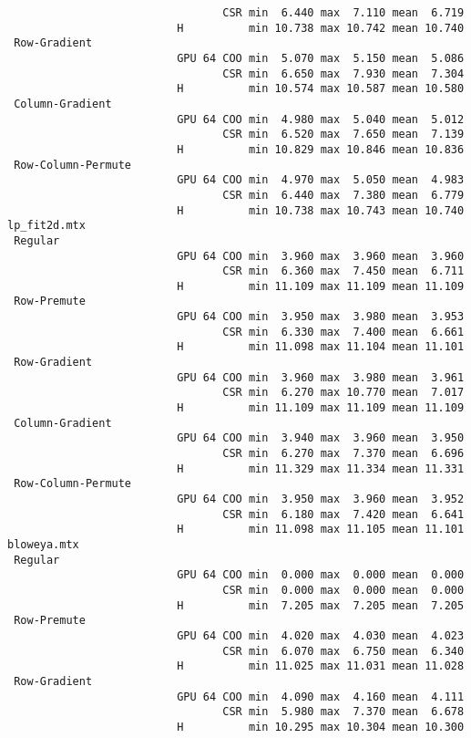 {\begin{verbatim}
                                 CSR min  6.440 max  7.110 mean  6.719
                          H          min 10.738 max 10.742 mean 10.740
 Row-Gradient
                          GPU 64 COO min  5.070 max  5.150 mean  5.086
                                 CSR min  6.650 max  7.930 mean  7.304
                          H          min 10.574 max 10.587 mean 10.580
 Column-Gradient
                          GPU 64 COO min  4.980 max  5.040 mean  5.012
                                 CSR min  6.520 max  7.650 mean  7.139
                          H          min 10.829 max 10.846 mean 10.836
 Row-Column-Permute
                          GPU 64 COO min  4.970 max  5.050 mean  4.983
                                 CSR min  6.440 max  7.380 mean  6.779
                          H          min 10.738 max 10.743 mean 10.740
lp_fit2d.mtx
 Regular
                          GPU 64 COO min  3.960 max  3.960 mean  3.960
                                 CSR min  6.360 max  7.450 mean  6.711
                          H          min 11.109 max 11.109 mean 11.109
 Row-Premute
                          GPU 64 COO min  3.950 max  3.980 mean  3.953
                                 CSR min  6.330 max  7.400 mean  6.661
                          H          min 11.098 max 11.104 mean 11.101
 Row-Gradient
                          GPU 64 COO min  3.960 max  3.980 mean  3.961
                                 CSR min  6.270 max 10.770 mean  7.017
                          H          min 11.109 max 11.109 mean 11.109
 Column-Gradient
                          GPU 64 COO min  3.940 max  3.960 mean  3.950
                                 CSR min  6.270 max  7.370 mean  6.696
                          H          min 11.329 max 11.334 mean 11.331
 Row-Column-Permute
                          GPU 64 COO min  3.950 max  3.960 mean  3.952
                                 CSR min  6.180 max  7.420 mean  6.641
                          H          min 11.098 max 11.105 mean 11.101
bloweya.mtx
 Regular
                          GPU 64 COO min  0.000 max  0.000 mean  0.000
                                 CSR min  0.000 max  0.000 mean  0.000
                          H          min  7.205 max  7.205 mean  7.205
 Row-Premute
                          GPU 64 COO min  4.020 max  4.030 mean  4.023
                                 CSR min  6.070 max  6.750 mean  6.340
                          H          min 11.025 max 11.031 mean 11.028
 Row-Gradient
                          GPU 64 COO min  4.090 max  4.160 mean  4.111
                                 CSR min  5.980 max  7.370 mean  6.678
                          H          min 10.295 max 10.304 mean 10.300

\end{verbatim}}
